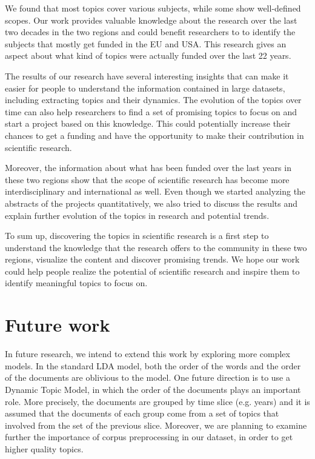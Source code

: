 \documentclass[12pt]{report}
\begin{document}
We found that most topics cover various subjects, while some show 
well-defined scopes. Our work provides
valuable knowledge about the research over the last two decades in the
two regions and could benefit researchers to to identify the subjects
that mostly get funded in the EU and USA. This research gives an aspect 
about what kind of topics were actually funded over
the last 22 years.

The results of our research have several interesting insights that can make it
easier for people to understand the information contained in large datasets,
including extracting topics and their dynamics. The evolution of the topics over
time can also help researchers to find a set of promising topics to focus on and
start a project based on this knowledge. This could potentially increase their
chances to get a funding and have the opportunity to make their contribution in
scientific research.

Moreover, the information about what has been funded over the last years in
these two regions show that the scope of scientific research has become more
interdisciplinary and international as well. Even though we started analyzing
the abstracts of the projects quantitatively, we also tried to discuss the
results and explain further evolution of the topics in research and potential
trends.

To sum up, discovering the topics in scientific research is a first step to
understand the knowledge that the research offers to the community in these two
regions, visualize the content and discover promising trends. We hope our work
could help people realize the potential of scientific research and inspire them
to identify meaningful topics to focus on.

\section{Future work}
\label{future}
In future research, we intend to extend this work by exploring more complex
models. In the standard LDA model, both the order of the words and the order of
the documents are oblivious to the model. One future direction is to use a
Dynamic Topic Model\cite{Blei:2006:DTM:1143844.1143859}, in which the order of
the documents plays an important role. More precisely, the documents are grouped
by time slice (e.g. years) and it is assumed that the documents of each group
come from a set of topics that involved from the set of the previous slice.
Moreover, we are planning to examine further the importance of corpus
preprocessing in our dataset, in order to get higher quality topics.
\end{document}
